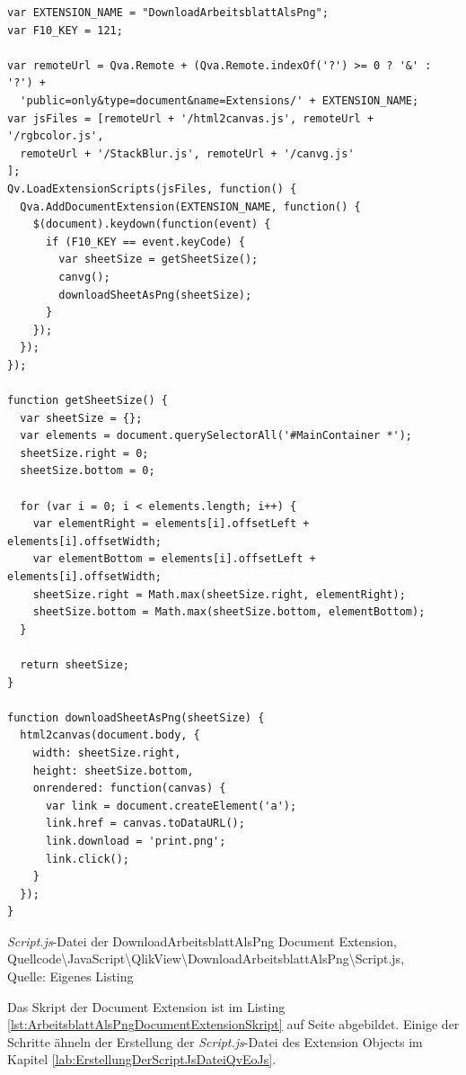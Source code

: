 \ifIncludeFigures\begin{listing}[htbp]
\begin{verbatim}
var EXTENSION_NAME = "DownloadArbeitsblattAlsPng";
var F10_KEY = 121;

var remoteUrl = Qva.Remote + (Qva.Remote.indexOf('?') >= 0 ? '&' : '?') +
  'public=only&type=document&name=Extensions/' + EXTENSION_NAME;
var jsFiles = [remoteUrl + '/html2canvas.js', remoteUrl + '/rgbcolor.js',
  remoteUrl + '/StackBlur.js', remoteUrl + '/canvg.js'
];
Qv.LoadExtensionScripts(jsFiles, function() {
  Qva.AddDocumentExtension(EXTENSION_NAME, function() {
    $(document).keydown(function(event) {
      if (F10_KEY == event.keyCode) {
        var sheetSize = getSheetSize();
        canvg();
        downloadSheetAsPng(sheetSize);
      }
    });
  });
});

function getSheetSize() {
  var sheetSize = {};
  var elements = document.querySelectorAll('#MainContainer *');
  sheetSize.right = 0;
  sheetSize.bottom = 0;

  for (var i = 0; i < elements.length; i++) {
    var elementRight = elements[i].offsetLeft + elements[i].offsetWidth;
    var elementBottom = elements[i].offsetLeft + elements[i].offsetWidth;
    sheetSize.right = Math.max(sheetSize.right, elementRight);
    sheetSize.bottom = Math.max(sheetSize.bottom, elementBottom);
  }

  return sheetSize;
}

function downloadSheetAsPng(sheetSize) {
  html2canvas(document.body, {
    width: sheetSize.right,
    height: sheetSize.bottom,
    onrendered: function(canvas) {
      var link = document.createElement('a');
      link.href = canvas.toDataURL();
      link.download = 'print.png';
      link.click();
    }
  });
}
\end{verbatim}
\caption[\textit{Script.js}-Datei der DownloadArbeitsblattAlsPng Document Extension]{\textit{Script.js}-Datei der DownloadArbeitsblattAlsPng Document Extension, \\Quellcode\textbackslash{}JavaScript\textbackslash{}QlikView\textbackslash{}DownloadArbeitsblattAlsPng\textbackslash{}Script.js, \\Quelle: Eigenes Listing}
\label{lst:ArbeitsblattAlsPngDocumentExtensionSkript}
\end{listing}\fi


Das Skript der Document Extension ist im Listing \ref{lst:ArbeitsblattAlsPngDocumentExtensionSkript} auf Seite \pageref{lst:ArbeitsblattAlsPngDocumentExtensionSkript} abgebildet. Einige der Schritte ähneln der Erstellung der \textit{Script.js}-Datei des Extension Objects im Kapitel \ref{lab:ErstellungDerScriptJsDateiQvEoJs}.


